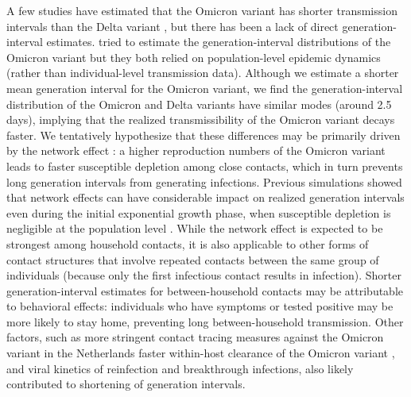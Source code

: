 \documentclass[12pt]{article}
\begin{document}
A few studies have estimated that the Omicron variant has shorter transmission intervals than the Delta variant \citep{abbott2022test,kremer2022observed,song2022serial}, but there has been a lack of direct generation-interval estimates.
\cite{ito2022estimating,selby2022generation} tried to estimate the generation-interval distributions of the Omicron variant but they both relied on population-level epidemic dynamics (rather than individual-level transmission data).
Although we estimate a shorter mean generation interval for the Omicron variant, we find the generation-interval distribution of the Omicron and Delta variants have similar modes (around 2.5 days), implying that the realized transmissibility of the Omicron variant decays faster.
We tentatively hypothesize that these differences may be primarily driven by the network effect \citep{park2020inferring,hart2022generation}: a higher reproduction numbers of the Omicron variant leads to faster susceptible depletion among close contacts, which in turn prevents long generation intervals from generating infections. 
Previous simulations showed that network effects can have considerable impact on realized generation intervals even during the initial exponential growth phase, when susceptible depletion is negligible at the population level \citep{park2020inferring}.
While the network effect is expected to be strongest among household contacts, it is also applicable to other forms of contact structures that involve repeated contacts between the same group of individuals (because only the first infectious contact results in infection).
Shorter generation-interval estimates for between-household contacts may be attributable to behavioral effects: individuals who have symptoms or tested positive may be more likely to stay home, preventing long between-household transmission.
Other factors, such as more stringent contact tracing measures against the Omicron variant in the Netherlands \citep{backer2021omicron} faster within-host clearance of the Omicron variant \citep{hay2022viral}, and viral kinetics of reinfection and breakthrough infections, also likely contributed to shortening of generation intervals.
\end{document}
